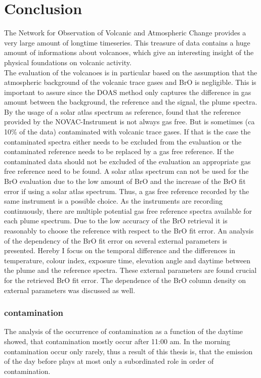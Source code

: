 \documentclass  [
  paper    = a4,
  BCOR     = 10mm,
  twoside,
  fontsize = 12pt,
  fleqn,
  toc      = bibnumbered,
  toc      = listofnumbered,
  numbers  = noendperiod,
  headings = normal,
  listof   = leveldown,
  version  = 3.03
]                                       {scrreprt}
\begin{document}
	\chapter{Conclusion}
	
	The Network for Observation of Volcanic and Atmospheric Change provides a very large amount of longtime timeseries. This treasure of data contains a huge amount of informations about volcanoes, which give an interesting insight of the physical foundations on volcanic activity.\\
	The evaluation of the volcanoes is in particular based on the assumption that the atmospheric background of the volcanic trace gases  and BrO is negligible. This is important to assure since the DOAS method only captures the difference in gas amount between the background, the reference and the signal, the plume spectra.\\
	By the usage of a solar atlas spectrum as reference, \citet{lubcke2016retrieval} found  that the reference provided by the NOVAC-Instrument is not always gas free. But is sometimes (ca 10\% of the data) contaminated with volcanic trace gases. If that is the case the contaminated spectra either needs to be excluded from the evaluation or the contaminated reference needs to be replaced by a gas free reference. If the contaminated data should not be excluded of the evaluation an appropriate gas free reference  need to be found. A solar atlas spectrum can not be used for the BrO evaluation due to the low amount of BrO and the increase of the BrO fit error if using a solar atlas spectrum. Thus, a gas free reference recorded by the same instrument is a possible choice.
	As the instruments are recording continuously, there are multiple potential gas free reference spectra available for each plume spectrum. Due to the low accuracy of the BrO retrieval it is reasonably to choose the reference with respect to the BrO fit error.
	An analysis of the dependency of the BrO fit error on several external parameters is presented. Hereby I focus on the temporal difference and the differences in temperature, colour index, exposure time, elevation angle and daytime between the plume and the reference spectra. These external parameters are found crucial for the retrieved BrO fit error. The dependence of the BrO column density on external parameters was discussed as well.
	\subsection*{ contamination}
	 The analysis of the occurrence of contamination as a function of the daytime showed, that contamination mostly occur after 11:00 am. In the morning contamination occur only rarely, thus a result of this thesis is, that the emission of the day before plays at most only a subordinated role in order of  contamination. 
\end{document}
